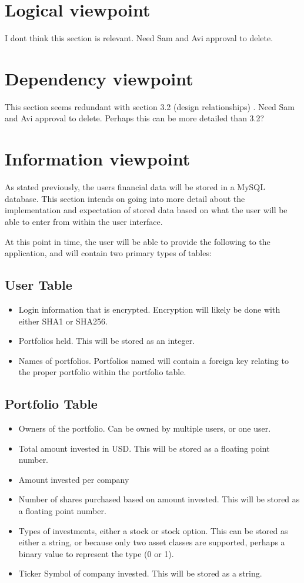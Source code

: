 \documentclass[onecolumn, draftclsnofoot,10pt, compsoc]{IEEEtran}
\begin{document}
\section{Logical viewpoint}
	I dont think this section is relevant. Need Sam and Avi approval to delete.
\section{Dependency viewpoint}
	This section seems redundant with section 3.2 (design relationships) . Need Sam and Avi approval to delete. Perhaps this can be more detailed than 3.2?
\section{Information viewpoint}
	As stated previously, the users financial data will be stored in a MySQL database. This section intends on going into more detail about the implementation and expectation of stored 
	data based on what the user will be able to enter from within the user interface.

	At this point in time, the user will be able to provide the following to the application, and will contain two primary types of tables:

\subsection{User Table}
\begin{itemize}
    \item Login information that is encrypted. Encryption will likely be done with either SHA1 or SHA256. 
    \item Portfolios held. This will be stored as an integer.
    \item Names of portfolios. Portfolios named will contain a foreign key relating to the proper portfolio within the portfolio table.
\end{itemize}
\subsection{Portfolio Table}
\begin{itemize}
    \item Owners of the portfolio. Can be owned by multiple users, or one user.
    \item Total amount invested in USD. This will be stored as a floating point number.
    \item Amount invested per company
    \item Number of shares purchased based on amount invested. This will be stored as a floating point number.
    \item Types of investments, either a stock or stock option. This can be stored as either a string, or because only two asset classes are supported, perhaps a binary value to represent the type (0 or 1).
    \item Ticker Symbol of company invested. This will be stored as a string.

\end{itemize}
\end{document}
